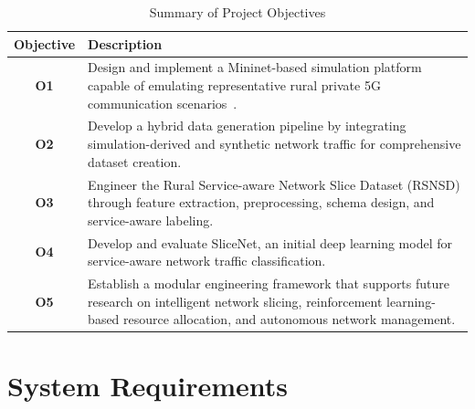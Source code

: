 \documentclass[12pt,a4paper]{report}
\begin{document}
	
	
	\begin{table}[H]
		\centering
		\caption{Summary of Project Objectives}
		\label{tab:objectives}
		
		\begin{tabular}{|c|p{11cm}|}
			\hline
			
			\textbf{Objective} &
			\textbf{Description}
			\\
			\hline
			
			\textbf{O1} &
			Design and implement a Mininet-based simulation platform capable of emulating representative rural private 5G communication scenarios~\cite{yaacoub2020key, suomalainen20185g, chih2014toward}.
			\\
			\hline
			
			\textbf{O2} &
			Develop a hybrid data generation pipeline by integrating simulation-derived and synthetic network traffic for comprehensive dataset creation.
			\\
			\hline
			
			\textbf{O3} &
			Engineer the Rural Service-aware Network Slice Dataset (RSNSD) through feature extraction, preprocessing, schema design, and service-aware labeling.
			\\
			\hline
			
			\textbf{O4} &
			Develop and evaluate SliceNet, an initial deep learning model for service-aware network traffic classification.
			\\
			\hline
			
			\textbf{O5} &
			Establish a modular engineering framework that supports future research on intelligent network slicing, reinforcement learning-based resource allocation, and autonomous network management.
			\\
			\hline
			
		\end{tabular}
		
	\end{table}
	\section{System Requirements}
	\label{sec:requirements}
	
\end{document}
